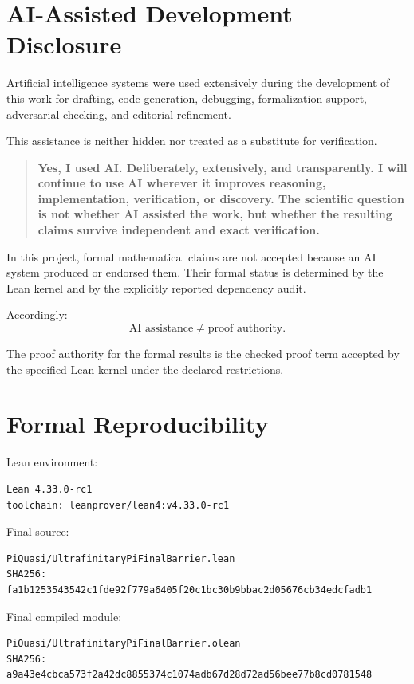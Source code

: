 \documentclass[11pt,a4paper]{article}
\begin{document}
\section*{AI-Assisted Development Disclosure}

Artificial intelligence systems were used extensively during the
development of this work for drafting, code generation, debugging,
formalization support, adversarial checking, and editorial refinement.

This assistance is neither hidden nor treated as a substitute for
verification.

\begin{quote}
\textbf{Yes, I used AI. Deliberately, extensively, and transparently.
I will continue to use AI wherever it improves reasoning,
implementation, verification, or discovery. The scientific question is
not whether AI assisted the work, but whether the resulting claims
survive independent and exact verification.}
\end{quote}

In this project, formal mathematical claims are not accepted because an
AI system produced or endorsed them. Their formal status is determined
by the Lean kernel and by the explicitly reported dependency audit.

Accordingly:
\[
\boxed{
\text{AI assistance}
\neq
\text{proof authority}.
}
\]

The proof authority for the formal results is the checked proof term
accepted by the specified Lean kernel under the declared restrictions.

\section*{Formal Reproducibility}

Lean environment:
\begin{verbatim}
Lean 4.33.0-rc1
toolchain: leanprover/lean4:v4.33.0-rc1
\end{verbatim}

Final source:
\begin{verbatim}
PiQuasi/UltrafinitaryPiFinalBarrier.lean
SHA256:
fa1b1253543542c1fde92f779a6405f20c1bc30b9bbac2d05676cb34edcfadb1
\end{verbatim}

Final compiled module:
\begin{verbatim}
PiQuasi/UltrafinitaryPiFinalBarrier.olean
SHA256:
a9a43e4cbca573f2a42dc8855374c1074adb67d28d72ad56bee77b8cd0781548
\end{verbatim}
\end{document}
